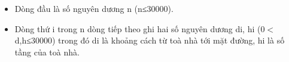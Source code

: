 \begin{itemize}
	\item Dòng đầu là số nguyên dương n (n≤30000).
	\item Dòng thứ i trong n dòng tiếp theo ghi hai số nguyên dương di, hi (0$<$d,h≤30000) trong đó di là khoảng cách từ toà nhà tới mặt đường, hi là số tầng của toà nhà.
\end{itemize}

\